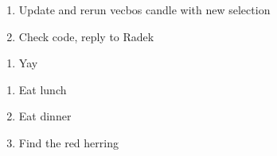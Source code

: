 

\begin{enumerate}
\item Update and rerun vecbos candle with new selection
\item Check code, reply to Radek
\end{enumerate}


\begin{enumerate}
\item Yay
\end{enumerate}



\begin{enumerate}
\item Eat lunch
\item Eat dinner
\item Find the red herring
\end{enumerate}


